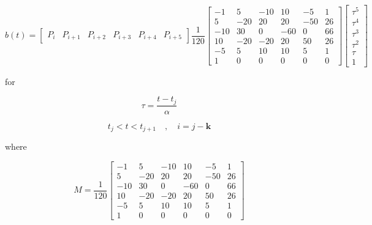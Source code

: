\documentclass{article}
\begin{document}
    \begin{equation}
        b(t) = \begin{bmatrix} P_i & P_{i+1} & P_{i+2} & P_{i+3} & P_{i+4} & P_{i+5} \end{bmatrix} \frac{1}{120} \begin{bmatrix} -1  &  5  & -10 &  10  & -5  & 1 \\
                                                     5  & -20 &  20 &  20  & -50 & 26\\
                                                    -10 &  30 &  0  & -60  &  0  & 66\\
                                                     10 & -20 & -20 &  20  &  50 & 26\\
                                                    -5  &  5  &  10 &  10  &  5  & 1\\
                                                     1  &  0  &  0  &  0   &  0  & 0\end{bmatrix} \begin{bmatrix} \tau^5 \\ \tau^4 \\ \tau^3 \\ \tau^2 \\ \tau \\ 1 \end{bmatrix}
    \end{equation}
    
    for
    
    \begin{equation}
        \tau = \frac{t-t_j}{\alpha}
    \end{equation}
    
    \begin{equation}
        t_j < t < t_{j+1} \quad , \quad i = j-\textbf{k}
    \end{equation}
    
    where 
    
    \begin{equation}
    M = \frac{1}{120} \begin{bmatrix} -1  &  5  & -10 &  10  & -5  & 1 \\
                                                     5  & -20 &  20 &  20  & -50 & 26\\
                                                    -10 &  30 &  0  & -60  &  0  & 66\\
                                                     10 & -20 & -20 &  20  &  50 & 26\\
                                                    -5  &  5  &  10 &  10  &  5  & 1\\
                                                     1  &  0  &  0  &  0   &  0  & 0\end{bmatrix}
    \end{equation}
    
\end{document}
